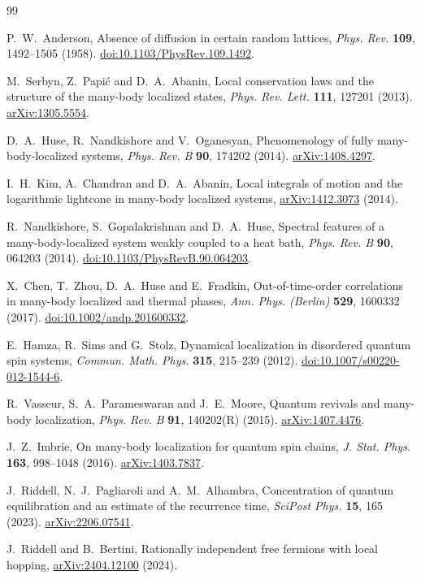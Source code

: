 \documentclass[10pt]{article}
\theoremstyle{definition}
\begin{document}
\begin{thebibliography}{99}
\small
\raggedright

P.~W.~Anderson,
Absence of diffusion in certain random lattices,
\emph{Phys. Rev.} \textbf{109}, 1492--1505 (1958).
\href{https://doi.org/10.1103/PhysRev.109.1492}
{doi:10.1103/PhysRev.109.1492}.

M.~Serbyn, Z.~Papi\'c and D.~A.~Abanin,
Local conservation laws and the structure of the many-body localized
states,
\emph{Phys. Rev. Lett.} \textbf{111}, 127201 (2013).
\href{https://arxiv.org/abs/1305.5554}{arXiv:1305.5554}.

D.~A.~Huse, R.~Nandkishore and V.~Oganesyan,
Phenomenology of fully many-body-localized systems,
\emph{Phys. Rev. B} \textbf{90}, 174202 (2014).
\href{https://arxiv.org/abs/1408.4297}{arXiv:1408.4297}.

I.~H.~Kim, A.~Chandran and D.~A.~Abanin,
Local integrals of motion and the logarithmic lightcone in many-body
localized systems,
\href{https://arxiv.org/abs/1412.3073}{arXiv:1412.3073} (2014).

R.~Nandkishore, S.~Gopalakrishnan and D.~A.~Huse,
Spectral features of a many-body-localized system weakly coupled to a heat
bath,
\emph{Phys. Rev. B} \textbf{90}, 064203 (2014).
\href{https://doi.org/10.1103/PhysRevB.90.064203}
{doi:10.1103/PhysRevB.90.064203}.

X.~Chen, T.~Zhou, D.~A.~Huse and E.~Fradkin,
Out-of-time-order correlations in many-body localized and thermal phases,
\emph{Ann. Phys. (Berlin)} \textbf{529}, 1600332 (2017).
\href{https://doi.org/10.1002/andp.201600332}
{doi:10.1002/andp.201600332}.

E.~Hamza, R.~Sims and G.~Stolz,
Dynamical localization in disordered quantum spin systems,
\emph{Commun. Math. Phys.} \textbf{315}, 215--239 (2012).
\href{https://doi.org/10.1007/s00220-012-1544-6}
{doi:10.1007/s00220-012-1544-6}.

R.~Vasseur, S.~A.~Parameswaran and J.~E.~Moore,
Quantum revivals and many-body localization,
\emph{Phys. Rev. B} \textbf{91}, 140202(R) (2015).
\href{https://arxiv.org/abs/1407.4476}{arXiv:1407.4476}.

J.~Z.~Imbrie,
On many-body localization for quantum spin chains,
\emph{J. Stat. Phys.} \textbf{163}, 998--1048 (2016).
\href{https://arxiv.org/abs/1403.7837}{arXiv:1403.7837}.

J.~Riddell, N.~J.~Pagliaroli and A.~M.~Alhambra,
Concentration of quantum equilibration and an estimate of the recurrence
time,
\emph{SciPost Phys.} \textbf{15}, 165 (2023).
\href{https://arxiv.org/abs/2206.07541}{arXiv:2206.07541}.

J.~Riddell and B.~Bertini,
Rationally independent free fermions with local hopping,
\href{https://arxiv.org/abs/2404.12100}{arXiv:2404.12100} (2024).

\end{thebibliography}
\end{document}

